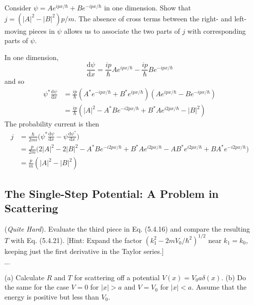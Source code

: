 \documentclass[../principles-of-quantum-mechanics.tex]{subfiles}
\begin{document}
\begin{questions}
	\question Consider $\psi = Ae^{ipx/\hbar} + Be^{-ipx/\hbar}$ in one dimension. Show that $j = (|A|^2 - |B|^2)p/m$. The absence of cross terms between the right- and left-moving pieces in $\psi$ allows us to associate the two parts of $j$ with corresponding parts of $\psi$.
	
	\begin{solution}
		In one dimension,
		$$\frac{\mathrm{d}\psi}{\mathrm{d}x} = \frac{ip}{\hbar}Ae^{ipx/\hbar} - \frac{ip}{\hbar}Be^{-ipx/\hbar}$$
		and so 
		\begin{align*}
			\psi^*\frac{\mathrm{d}\psi}{\mathrm{d}x} &= \frac{ip}{\hbar}(A^*e^{-ipx/\hbar} + B^*e^{ipx/\hbar})(Ae^{ipx/\hbar} - Be^{-ipx/\hbar}) \\
			&= \frac{ip}{\hbar}(|A|^2 - A^*Be^{-i2px/\hbar} + B^*Ae^{i2px/\hbar} - |B|^2)
		\end{align*}
		The probability current is then
		\begin{align*}
			j &= \frac{\hbar}{2mi}\Big(\psi^*\frac{\mathrm{d}\psi}{\mathrm{d}x} - \psi\frac{\mathrm{d}\psi^*}{\mathrm{d}x}\Big) \\
			&= \frac{p}{2m}\Big(2|A|^2 - 2|B|^2 - A^*Be^{-i2px/\hbar} + B^*Ae^{i2px/\hbar} - AB^*e^{i2px/\hbar} + BA^*e^{-i2px/\hbar}\Big) \\
			&= \frac{p}{m}(|A|^2 - |B|^2)
		\end{align*}
	\end{solution}

	\setcounter{subsection}{3}
	\setcounter{question}{0}
	\subsection{The Single-Step Potential: A Problem in Scattering}
	\question (\textit{Quite Hard}). Evaluate the third piece in Eq. (5.4.16) and compare the resulting $T$ with Eq. (5.4.21). [Hint: Expand the factor $(k_1^2-2mV_0/\hbar^2)^{1/2}$ near $k_1=k_0$, keeping just the first derivative in the Taylor series.]
	
	\begin{solution}
		$\cdots$
	\end{solution}
	
	\question (a) Calculate $R$ and $T$ for scattering off a potential $V(x) = V_0a\delta(x)$. (b) Do the same for the case $V=0$ for $|x| > a$ and $V = V_0$ for $|x| < a$. Assume that the energy is positive but less than $V_0$.
	

\end{questions}
\end{document}
